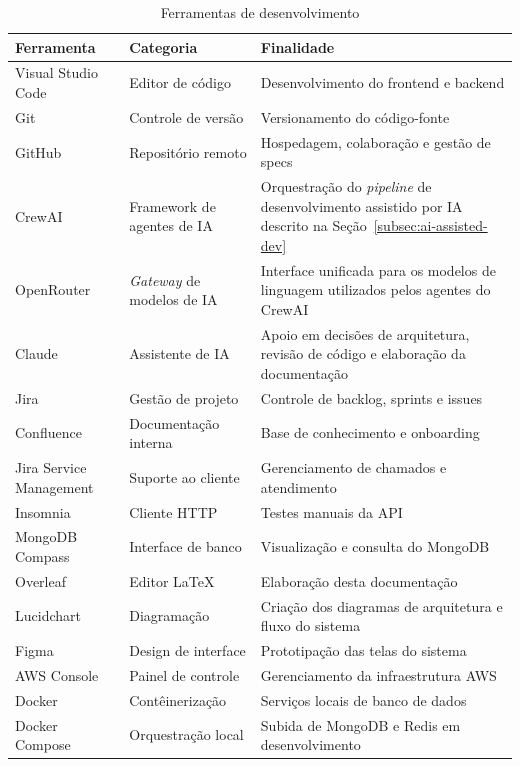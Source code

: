 \begin{table}[H]
  \centering
  \caption{Ferramentas de desenvolvimento}
  \label{tab:tools}
  \begin{tabular}{p{3.8cm}p{3cm}p{7cm}}
    \toprule
    \textbf{Ferramenta} &
    \textbf{Categoria} &
    \textbf{Finalidade} \\
    \midrule
    Visual Studio Code  & Editor de código
      & Desenvolvimento do frontend e backend \\
    Git                 & Controle de versão
      & Versionamento do código-fonte \\
    GitHub              & Repositório remoto
      & Hospedagem, colaboração e gestão de specs \\
    CrewAI              & Framework de agentes de IA
      & Orquestração do \textit{pipeline} de
        desenvolvimento assistido por IA descrito
        na Seção~\ref{subsec:ai-assisted-dev} \\
    OpenRouter          & \textit{Gateway} de modelos de IA
      & Interface unificada para os modelos de
        linguagem utilizados pelos agentes do
        CrewAI \\
    Claude              & Assistente de IA
      & Apoio em decisões de arquitetura, revisão
        de código e elaboração da documentação \\
    Jira                & Gestão de projeto
      & Controle de backlog, sprints e issues \\
    Confluence          & Documentação interna
      & Base de conhecimento e onboarding \\
    Jira Service Management & Suporte ao cliente
      & Gerenciamento de chamados e atendimento \\
    Insomnia            & Cliente HTTP
      & Testes manuais da API \\
    MongoDB Compass     & Interface de banco
      & Visualização e consulta do MongoDB \\
    Overleaf            & Editor \LaTeX
      & Elaboração desta documentação \\
    Lucidchart          & Diagramação
      & Criação dos diagramas de arquitetura
        e fluxo do sistema \\
    Figma               & Design de interface
      & Prototipação das telas do sistema \\
    AWS Console         & Painel de controle
      & Gerenciamento da infraestrutura AWS \\
    Docker              & Contêinerização
      & Serviços locais de banco de dados \\
    Docker Compose      & Orquestração local
      & Subida de MongoDB e Redis em desenvolvimento \\
    \bottomrule
  \end{tabular}
\end{table}

